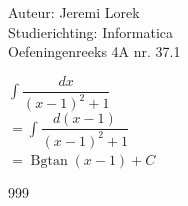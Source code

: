 \documentclass[a4paper]{article}
\begin{document}
\noindent \large Auteur: Jeremi Lorek\\
\noindent \large Studierichting: Informatica\\
\noindent \large Oefeningenreeks 4A nr. 37.1\\

\medskip
\normalsize

$\displaystyle \int \dfrac{dx}{(x - 1)^2 + 1}$ \\

$= \displaystyle \int \dfrac{d(x - 1)}{(x - 1)^2 + 1}$ \\

$= \operatorname{Bgtan}(x - 1) + C$ \\

\begin{thebibliography}{999}
\end{thebibliography}
\end{document}
